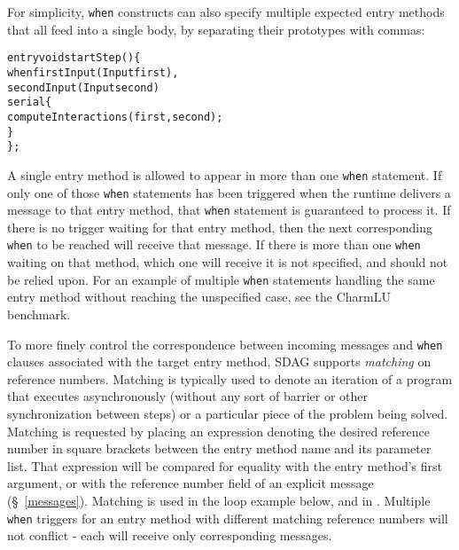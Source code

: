 For simplicity, {\tt when} constructs can also specify multiple expected entry
methods that all feed into a single body, by separating their prototypes with
commas:
\begin{center}
\begin{alltt}
entry void startStep() \{
  when firstInput(Input first),
       secondInput(Input second)
    serial \{
      computeInteractions(first, second);
    \}
\};
\end{alltt}
\end{center}

A single entry method is allowed to appear in more than one {\tt when} statement.
If only one of those {\tt when} statements has been triggered when the runtime
delivers a message to that entry method, that {\tt when} statement is guaranteed
to process it. If there is no trigger waiting for that entry method, then the
next corresponding {\tt when} to be reached will receive that message. If there is
more than one {\tt when} waiting on that method, which one will receive it is not
specified, and should not be relied upon. For an example of multiple {\tt when}
statements handling the same entry method without reaching the unspecified case,
see the CharmLU benchmark.

To more finely control the correspondence between incoming messages and {\tt when}
clauses associated with the target entry method, SDAG supports \emph{matching} on
reference numbers. Matching is typically used to denote an iteration of a program
that executes asynchronously (without any sort of barrier or other synchronization
between steps) or a particular piece of the problem being solved.
Matching is requested by placing an expression denoting the desired reference
number in square brackets between the entry method name and its parameter list.
That expression will be compared for equality with the entry method's first
argument, or with the reference number field of an explicit message
(\S~\ref{messages}). Matching is used in the loop example below, and in
. Multiple {\tt when} triggers for
an entry method with different matching reference numbers will not conflict - each
will receive only corresponding messages.

